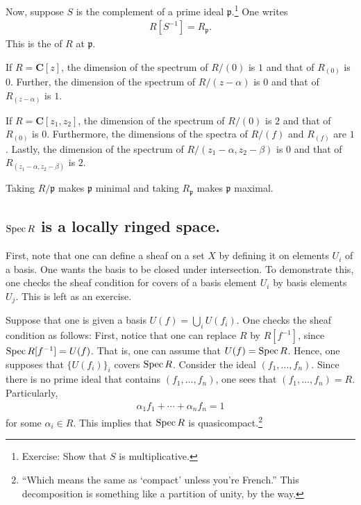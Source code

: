 \documentclass [11 pt, oneside] {article}
\begin{document}
Now, suppose $S$ is the complement of a prime ideal $\mathfrak{p}$.\footnote{Exercise: Show that $S$ is multiplicative.} One writes
\begin{align*}
	R[S^{-1}] = R_{\mathfrak{p}}.
\end{align*}
This is the  of $R$ at $\mathfrak{p}$.

\begin{remark}
	If $R=\mathbf{C}[z]$, the dimension of the spectrum of $R/(0)$ is $1$ and that of $R_{(0)}$ is $0$. Further, the dimension of the spectrum of $R/(z-\alpha)$ is $0$ and that of $R_{(z-\alpha) }$ is $1$.

	If $R=\mathbf{C}[z_1,z_2]$, the dimension of the spectrum of $R/(0)$ is $2$ and that of $R_{(0)}$ is $0$. Furthermore, the dimensions of the spectra of $R/(f)$ and $R_{(f)}$ are $1$. Lastly, the dimension of the spectrum of $R/(z_1-\alpha, z_2-\beta)$ is $0$ and that of $R_{(z_1-\alpha,z_2-\beta)}$ is $2$. 
\end{remark}

\begin{remark}
	Taking $R/\mathfrak{p}$ makes $\mathfrak{p}$ minimal and taking $R_{\mathfrak{p}}$ makes $\mathfrak{p}$ maximal.
\end{remark}

\subsection{\texorpdfstring{$\operatorname{Spec} R$}{Spec R} is a locally ringed space.}
First, note that one can define a sheaf on a set $X$ by defining it on elements $U_i$ of a basis. One wants the basis to be closed under intersection. To demonstrate this, one checks the sheaf condition for covers of a basis element $U_i$ by basis elements $U_j$. This is left as an exercise.

Suppose that one is given a basis $U(f) = \bigcup_ i U(f_i)$. One checks the sheaf condition as follows: First, notice that one can replace $R$ by $R[f^{-1}]$, since $\operatorname{Spec} R[f^{-1}]= U(f)$. That is, one can assume that $U(f) = \operatorname{Spec} R$. Hence, one supposes that $\{U(f_i)\}_i$ covers $\operatorname{Spec} R$. Consider the ideal $(f_1,\hdots, f_n)$. Since there is no prime ideal that contains $(f_1,\hdots, f_n)$, one sees that $(f_1,\hdots, f_n)=R$. Particularly, 
\begin{align*}
	\alpha_1f_1 + \cdots +\alpha_nf_n = 1
\end{align*}
for some $\alpha_i\in R$. This implies that $\operatorname{Spec} R$ is quasicompact.\footnote{``Which means the same as `compact' unless you're French.'' This decomposition is something like a partition of unity, by the way.}
\end{document}
